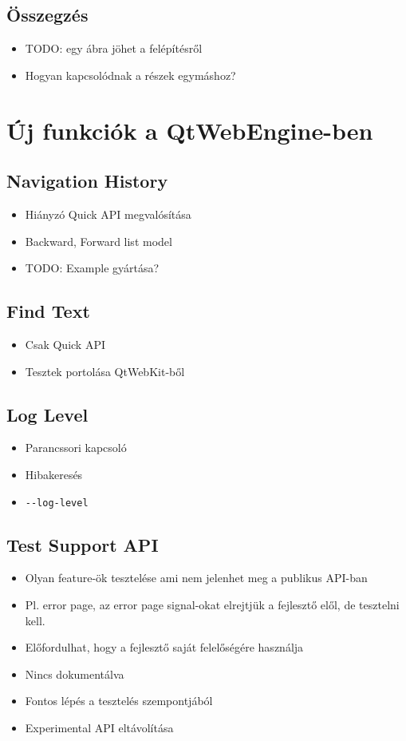 \documentclass[12pt]{report}
\begin{document}
\section{Összegzés}
\begin{itemize}
    \item TODO: egy ábra jöhet a felépítésről
    \item Hogyan kapcsolódnak a részek egymáshoz?
\end{itemize}


\chapter{Új funkciók a QtWebEngine-ben}

\section{Navigation History}

\begin{itemize}
    \item Hiányzó Quick API megvalósítása
    \item Backward, Forward list model
    \item TODO: Example gyártása?
\end{itemize}
\pagebreak

\section{Find Text}
\begin{itemize}
    \item Csak Quick API
    \item Tesztek portolása QtWebKit-ből
\end{itemize}
\pagebreak

\section{Log Level}
\begin{itemize}
    \item Parancssori kapcsoló
    \item Hibakeresés
    \item \texttt{-{}-log-level}
\end{itemize}
\pagebreak

\section{Test Support API}
\begin{itemize}
    \item Olyan feature-ök tesztelése ami nem jelenhet meg a publikus API-ban
    \item Pl. error page, az error page signal-okat elrejtjük a fejlesztő elől, de tesztelni
        kell.
    \item Előfordulhat, hogy a fejlesztő saját felelőségére használja
    \item Nincs dokumentálva
    \item Fontos lépés a tesztelés szempontjából
    \item Experimental API eltávolítása
\end{itemize}
\pagebreak
\end{document}
